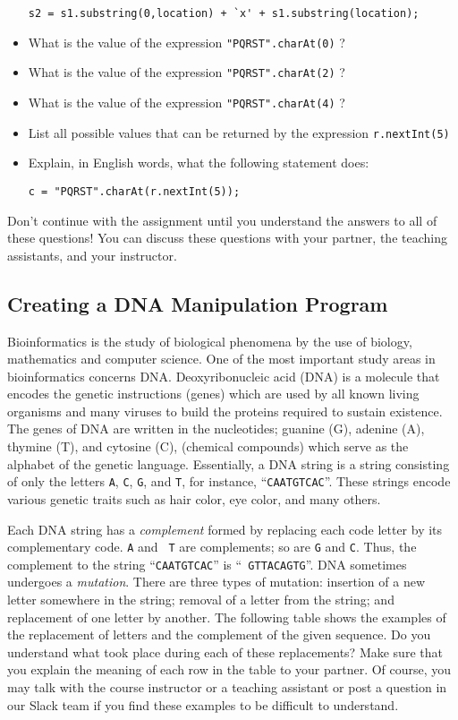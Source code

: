 \begin{itemize}
\begin{center}
\verb$s2 = s1.substring(0,location) + `x' + s1.substring(location);$
\end{center}
\item
What is the value of the expression \verb$"PQRST".charAt(0)$ ?
\item
What is the value of the expression \verb$"PQRST".charAt(2)$ ?
\item
What is the value of the expression \verb$"PQRST".charAt(4)$ ?
\item
List all possible values that can be returned by the expression
\verb$r.nextInt(5)$
\item
Explain, in English words, what the following statement does:
\begin{center}
\verb$c = "PQRST".charAt(r.nextInt(5));$
\end{center}
\end{itemize}

\noindent Don't continue with the assignment until you understand the answers to all of these questions!  You can discuss
these questions with your partner, the teaching assistants, and your instructor.

\vspace{-0.05in}
\subsection*{Creating a DNA Manipulation Program}
\vspace{-0.05in}

Bioinformatics is the study of biological phenomena by the use of biology, mathematics and computer science. One of the
most important study areas in bioinformatics concerns DNA. Deoxyribonucleic acid (DNA) is a molecule that encodes the
genetic instructions (genes) which are used by all known living organisms and many viruses to build the proteins
required to sustain existence. The genes of DNA are written in the nucleotides; guanine (G), adenine (A), thymine (T),
and cytosine (C), (chemical compounds) which serve as the alphabet of the genetic language.  Essentially, a DNA string
is a string consisting of only the letters {\tt A}, {\tt C}, {\tt G}, and {\tt T}, for instance, ``{\tt CAATGTCAC}''.
These strings encode various genetic traits such as hair color, eye color, and many others.

Each DNA string has a {\em complement} formed by replacing each code letter by its complementary code. {\tt A} and {\tt
T} are complements; so are {\tt G} and {\tt C}. Thus, the complement to the string ``{\tt CAATGTCAC}'' is ``{\tt
GTTACAGTG}''.  DNA sometimes undergoes a {\em mutation}. There are three types of mutation: insertion of a new letter
somewhere in the string; removal of a letter from the string; and replacement of one letter by another. The following
table shows the examples of the replacement of letters and the complement of the given sequence. Do you understand what
took place during each of these replacements? Make sure that you explain the meaning of each row in the table to your
partner. Of course, you may talk with the course instructor or a teaching assistant or post a question in our Slack team
if you find these examples to be difficult to understand.

